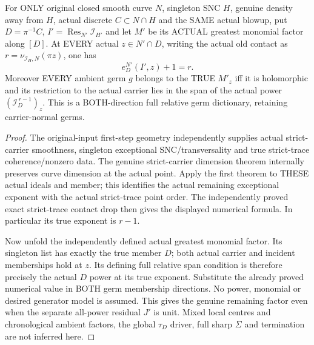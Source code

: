 \begin{theorem}
\label{hir:sharp-actual-first-curve-remaining-factor-computed-exponent-germs}
\leanok
For ONLY original closed smooth curve $N$, singleton SNC $H$, genuine
density away from $H$, actual discrete $C\subset N\cap H$ and the SAME
actual blowup, put $D=\pi^{-1}C$, $I'=\operatorname{Res}_{N'}\mathcal I_{H'}$
and let $M'$ be its ACTUAL greatest monomial factor along $[D]$.
At EVERY actual $z\in N'\cap D$, writing the actual old contact as
$r=\nu_{\mathcal I_H,N}(\pi z)$, one has
\[
 e_D^{N'}(I',z)+1=r.
\]
Moreover EVERY ambient germ $g$ belongs to the TRUE $M'_z$ iff it is
holomorphic and its restriction to the actual carrier lies in the span
of the actual power $(\mathcal I_D^{\,r-1})_z$. This is a BOTH-direction
full relative germ dictionary, retaining carrier-normal germs.
\end{theorem}
\begin{proof}
The original-input first-step geometry independently supplies actual
strict-carrier smoothness, singleton exceptional SNC/transversality and
true strict-trace coherence/nonzero data. The genuine strict-carrier
dimension theorem internally preserves curve dimension at the actual
point. Apply the first theorem to THESE actual ideals and member; this
identifies the actual remaining exceptional exponent with the actual
strict-trace point order. The independently proved exact strict-trace
contact drop then gives the displayed numerical formula. In particular
its true exponent is $r-1$.

Now unfold the independently defined actual greatest monomial factor.
Its singleton list has exactly the true member $D$; both actual carrier
and incident memberships hold at $z$. Its defining full relative span
condition is therefore precisely the actual $D$ power at its true
exponent. Substitute the already proved numerical value in BOTH germ
membership directions. No power, monomial or desired generator model is
assumed. This gives the genuine remaining factor even when the separate
all-power residual $J'$ is unit. Mixed local centres and chronological
ambient factors, the global $\tau_D$ driver, full sharp $\Sigma$ and
termination are not inferred here.
\end{proof}
